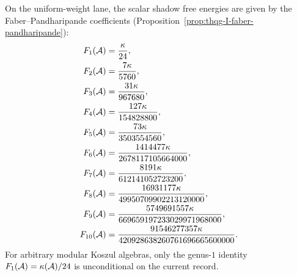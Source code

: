 \begin{proposition}
\label{prop:thqg-I-Fg-values}
On the uniform-weight lane, the scalar shadow free energies are given by the
Faber--Pandharipande coefficients
\textup{(}Proposition~\ref{prop:thqg-I-faber-pandharipande}\textup{)}:
\begin{align}
F_1(\mathcal{A}) &= \frac{\kappa}{24}, \label{eq:thqg-I-F1}\\
F_2(\mathcal{A}) &= \frac{7\kappa}{5760}, \label{eq:thqg-I-F2}\\
F_3(\mathcal{A}) &= \frac{31\kappa}{967680}, \label{eq:thqg-I-F3}\\
F_4(\mathcal{A}) &= \frac{127\kappa}{154828800}, \label{eq:thqg-I-F4}\\
F_5(\mathcal{A}) &= \frac{73\kappa}{3503554560}, \label{eq:thqg-I-F5}\\
F_6(\mathcal{A}) &= \frac{1414477\kappa}{2678117105664000}, \label{eq:thqg-I-F6}\\
F_7(\mathcal{A}) &= \frac{8191\kappa}{612141052723200}, \label{eq:thqg-I-F7}\\
F_8(\mathcal{A}) &= \frac{16931177\kappa}{49950709902213120000}, \label{eq:thqg-I-F8}\\
F_9(\mathcal{A}) &= \frac{5749691557\kappa}{669659197233029971968000}, \label{eq:thqg-I-F9}\\
F_{10}(\mathcal{A}) &= \frac{91546277357\kappa}{420928638260761696665600000}. \label{eq:thqg-I-F10}
\end{align}
For arbitrary modular Koszul algebras, only the genus-$1$ identity
$F_1(\mathcal{A})=\kappa(\mathcal{A})/24$ is unconditional on the current record.
\end{proposition}

